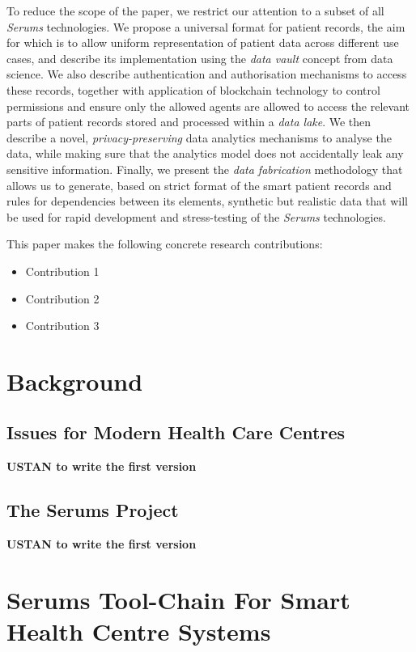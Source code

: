 To reduce the scope of the paper, we restrict our attention to a subset of all \emph{Serums} technologies. We propose a universal format for patient records, the aim for which is to allow uniform representation of patient data across different use cases, and describe its implementation using the \emph{data vault} concept from data science. We also describe authentication and authorisation mechanisms to access these records, together with application of blockchain technology to control permissions and ensure only the allowed agents are allowed to access the relevant parts of patient records stored and processed within a \emph{data lake}. We then describe a novel, \emph{privacy-preserving} data analytics mechanisms to analyse the data, while making sure that the analytics model does not accidentally leak any sensitive information. Finally, we present the \emph{data fabrication} methodology that allows us to generate, based on strict format of the smart patient records and rules for dependencies between its elements, synthetic but realistic data that will be used for rapid development and stress-testing of the \emph{Serums} technologies.


This paper makes the following concrete research contributions:
\begin{itemize}
\item Contribution 1
\item Contribution 2
\item Contribution 3
\end{itemize}

\section{Background}


\subsection{Issues for Modern Health Care Centres}

\textbf{USTAN to write the first version}

\subsection{The Serums Project}

\textbf{USTAN to write the first version}

\section{Serums Tool-Chain For Smart Health Centre Systems}

